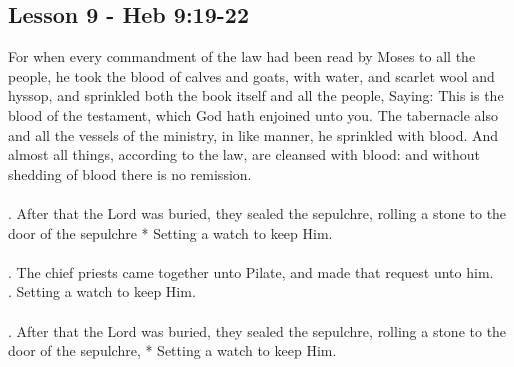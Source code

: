 \subsection{Lesson 9 - Heb 9:19-22}
\begin{Parallel}[v]{\colw}{\colx}
{}
{\vern
{\noindent
For when every commandment of the law had been read by Moses to all the people, he took the blood of calves and goats, with water, and scarlet wool and hyssop, and sprinkled both the book itself and all the people,
Saying: This is the blood of the testament, which God hath enjoined unto you.
The tabernacle also and all the vessels of the ministry, in like manner, he sprinkled with blood.
And almost all things, according to the law, are cleansed with blood: and without shedding of blood there is no remission.
\\ \\
\Rbar. After that the Lord was buried, they sealed the sepulchre, rolling a stone to the door of the sepulchre
* Setting a watch to keep Him.\\ \\
\Vbar. The chief priests came together unto Pilate, and made that request unto him.\\
\Rbar. Setting a watch to keep Him.\\ \\
\Rbar. After that the Lord was buried, they sealed the sepulchre, rolling a stone to the door of the sepulchre, * Setting a watch to keep Him.}}

\end{Parallel}